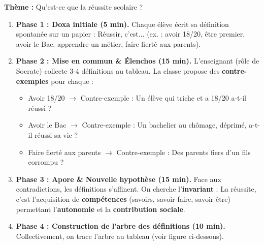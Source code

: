\documentclass[11pt]{article}
\begin{document}
\textbf{Thème :} \og Qu'est-ce que la réussite scolaire ? \fg{}

\begin{methode}
\begin{enumerate}
    \item \textbf{Phase 1 : Doxa initiale (5 min).} Chaque élève écrit sa définition spontanée sur un papier : \og Réussir, c'est... \fg{} (ex. : avoir 18/20, être premier, avoir le Bac, apprendre un métier, faire fierté aux parents).
    \item \textbf{Phase 2 : Mise en commun \& Élenchos (15 min).} L'enseignant (rôle de Socrate) collecte 3-4 définitions au tableau. La classe propose des \textbf{contre-exemples} pour chaque :
    \begin{itemize}
        \item \og Avoir 18/20 \fg{} $\rightarrow$ Contre-exemple : Un élève qui triche et a 18/20 a-t-il réussi ?
        \item \og Avoir le Bac \fg{} $\rightarrow$ Contre-exemple : Un bachelier au chômage, déprimé, a-t-il réussi sa vie ?
        \item \og Faire fierté aux parents \fg{} $\rightarrow$ Contre-exemple : Des parents fiers d'un fils corrompu ?
    \end{itemize}
    \item \textbf{Phase 3 : Apore \& Nouvelle hypothèse (15 min).} Face aux contradictions, les définitions s'affinent. On cherche l'\textbf{invariant} : \og La réussite, c'est l'acquisition de \textbf{compétences} (savoirs, savoir-faire, savoir-être) permettant l'\textbf{autonomie} et la \textbf{contribution sociale}. \fg{}
    \item \textbf{Phase 4 : Construction de l'arbre des définitions (10 min).} Collectivement, on trace l'arbre au tableau (voir figure ci-dessous).
\end{enumerate}
\end{methode}
\end{document}
